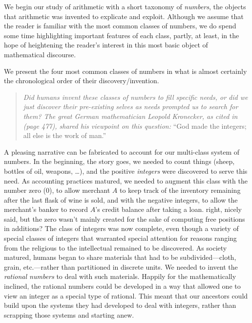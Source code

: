 We begin our study of arithmetic with a short taxonomy of {\it
  numbers}, the objects that arithmetic was invented to explicate and
exploit.  Although we assume that the reader is familiar with the most
common classes of numbers, we do spend some time highlighting
important features of each class, partly, at least, in the hope of
heightening the reader's interest in this most basic object of
mathematical discourse.

We present the four most common classes of numbers in what is almost
certainly the chronological order of their discovery/invention.
\begin{quote}
{\em Did humans {\em invent} these classes of numbers to fill specific
  needs, or did we just {\em discover} their pre-existing selves as
  needs prompted us to search for them?  The great German
  mathematician Leopold Kronecker,
as cited in \cite{Bell86} (page 477), shared his viewpoint on this
question:} ``God made the integers; all else is the work of man.''
\end{quote}
A pleasing narrative can be fabricated to account for our multi-class
system of numbers.  In the beginning, the story goes, we needed to
count things (sheep, bottles of oil, weapons, \ldots), and the
positive {\it integers} were discovered to serve
this need.  As accounting practices matured, we needed to augment this
class with the number zero  ($0$), to allow
merchant $A$ to keep track of the inventory remaining after the last
flask of wine is sold, and with the negative integers,
 to allow the merchant's banker to record $A$'s
credit balance after taking a loan.  
{\Denis right, nicely said, but the zero wasn't mainly created for the sake of computing free positions
in additions?} The class of integers was now
complete, even though a variety of special classes of integers that
warranted special attention for reasons ranging from the religious to
the intellectual remained to be discovered.  As society matured,
humans began to share materials that had to be subdivided---cloth,
grain, etc.---rather than partitioned in discrete units.  We needed to
invent the {\it rational numbers} 
%
to deal with such materials.  Happily for the mathematically inclined,
the rational numbers could be developed in a way that allowed one to
view an integer as a special type of rational.  This meant that our
ancestors could build upon the systems they had developed to deal with
integers, rather than scrapping those systems and starting anew.
